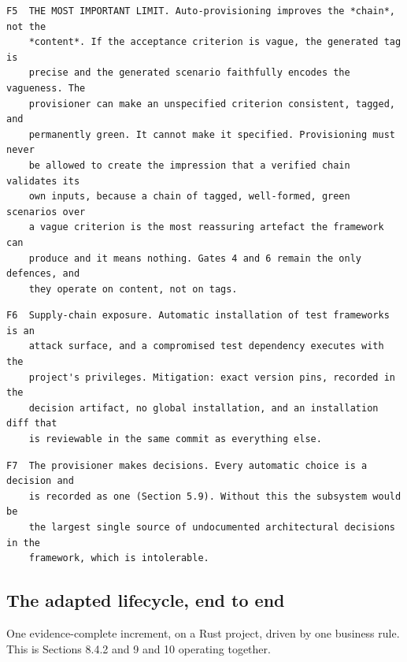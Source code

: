 \documentclass[11pt,a4paper]{article}
\begin{document}
\begin{Verbatim}[fontsize=\footnotesize,breaklines=true,breakanywhere=true,breakautoindent=false,samepage=false]
F5  THE MOST IMPORTANT LIMIT. Auto-provisioning improves the *chain*, not the
    *content*. If the acceptance criterion is vague, the generated tag is
    precise and the generated scenario faithfully encodes the vagueness. The
    provisioner can make an unspecified criterion consistent, tagged, and
    permanently green. It cannot make it specified. Provisioning must never
    be allowed to create the impression that a verified chain validates its
    own inputs, because a chain of tagged, well-formed, green scenarios over
    a vague criterion is the most reassuring artefact the framework can
    produce and it means nothing. Gates 4 and 6 remain the only defences, and
    they operate on content, not on tags.
\end{Verbatim}

\begin{Verbatim}[fontsize=\footnotesize,breaklines=true,breakanywhere=true,breakautoindent=false,samepage=false]
F6  Supply-chain exposure. Automatic installation of test frameworks is an
    attack surface, and a compromised test dependency executes with the
    project's privileges. Mitigation: exact version pins, recorded in the
    decision artifact, no global installation, and an installation diff that
    is reviewable in the same commit as everything else.
\end{Verbatim}

\begin{Verbatim}[fontsize=\footnotesize,breaklines=true,breakanywhere=true,breakautoindent=false,samepage=false]
F7  The provisioner makes decisions. Every automatic choice is a decision and
    is recorded as one (Section 5.9). Without this the subsystem would be
    the largest single source of undocumented architectural decisions in the
    framework, which is intolerable.
\end{Verbatim}

\subsection{The adapted lifecycle, end to end}

One evidence-complete increment, on a Rust project, driven by one business rule. This is Sections 8.4.2 and 9 and 10 operating together.
\end{document}
